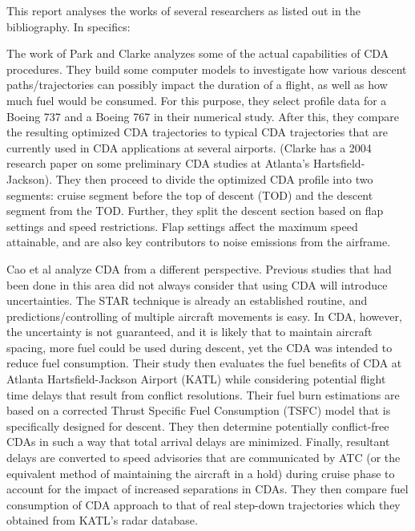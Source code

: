 \documentclass{aer1315-pretty}
\begin{document}
This report analyses the works of several researchers as listed out in the bibliography. In specifics:\par

The work of Park and Clarke \cite{Park:2015} analyzes some of the actual capabilities of CDA procedures. They build some computer models to investigate how various descent paths/trajectories can possibly impact the duration of a flight, as well as how much fuel would be consumed. For this purpose, they select profile data for a Boeing 737 and a Boeing 767 in their numerical study. After this, they compare the resulting optimized CDA trajectories to typical CDA trajectories that are currently used in CDA applications at several airports. (Clarke has a 2004 research paper on some preliminary CDA studies at Atlanta's Hartsfield-Jackson). They then proceed to divide the optimized CDA profile into two segments: cruise segment before the top of descent (TOD) and the descent segment from the TOD. Further, they split the descent section based on flap settings and speed restrictions. Flap settings affect the maximum speed attainable, and are also key contributors to noise emissions from the airframe.\par 

Cao et al \cite{Cao:2013} analyze CDA from a different perspective. Previous studies that had been done in this area did not always consider that using CDA will introduce uncertainties. The STAR technique is already an established routine, and predictions/controlling of multiple aircraft movements is easy. In CDA, however, the uncertainty is not guaranteed, and it is likely that to maintain aircraft spacing, more fuel could be used during descent, yet the CDA was intended to reduce fuel consumption. Their study then evaluates the fuel benefits of CDA at Atlanta Hartsfield-Jackson Airport (KATL) while considering potential flight time delays that result from conflict resolutions. Their fuel burn estimations are based on a corrected Thrust Specific Fuel Consumption (TSFC) model that is specifically designed for descent. They then determine potentially conflict-free CDAs in such a way that total arrival delays are minimized. Finally, resultant delays are converted to speed advisories that are communicated by ATC (or the equivalent method of maintaining the aircraft in a hold) during cruise phase to account for the impact of increased separations in CDAs. They then compare fuel consumption of CDA approach to that of real step-down trajectories which they obtained from KATL's radar database. \par
\end{document}

